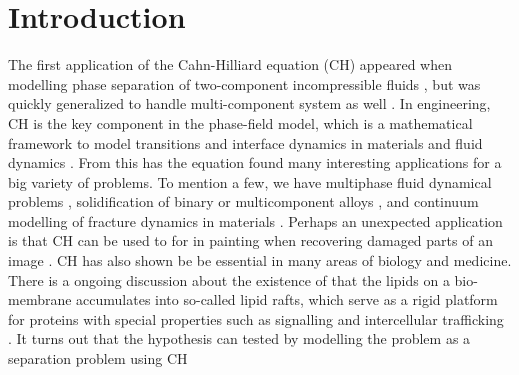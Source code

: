 \section{Introduction}\label{sec:introduction}



The first application of the Cahn-Hilliard equation (CH) appeared when modelling phase separation of two-component incompressible fluids \cite{cahn1958free, cahn1959free, cahn1961spinodal}, but was quickly generalized to handle multi-component system
as well \cite{bosch2015fractional, eyre1993systems, toth2016phase, miranville2017cahn}. In engineering, CH is the key component in
the phase-field model, which is a mathematical framework to model transitions and interface dynamics in materials and fluid dynamics \cite{steinbach2009phase, chen2002phase}.
From this has the equation found many interesting applications for a big variety of problems. To mention a few, we have
multiphase fluid dynamical problems \cite{badalassi2003computation, li2016lattice, kim2012phase, shen2010phase}, solidification of binary or multicomponent alloys \cite{kim1999phase, echebarria2004quantitative}, and continuum modelling of fracture dynamics in
materials \cite{kuhn2010continuum, li2015phase}. Perhaps an unexpected application is that CH can be used to for in painting when recovering damaged parts of an image \cite{bertozzi2006inpainting, burger2009cahn, bosch2015fractional, brkic2020image}.
CH has also shown be be essential in many areas of biology and medicine. There is a ongoing discussion about the existence of that the lipids on a bio-membrane accumulates into so-called lipid rafts, which serve as a rigid platform for proteins with
special properties such as signalling and intercellular trafficking \cite{ levental2020lipid, hancock2006lipid, munro2003lipid, simons1997functional}. It turns out that the hypothesis can tested by modelling the problem as a separation problem using
CH \cite{miller2020divide, garcke2016coupled, yushutin2019computational}




